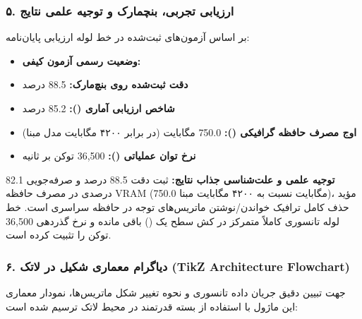 \subsubsection*{۵. ارزیابی تجربی، بنچمارک و توجیه علمی نتایج}
بر اساس آزمون‌های ثبت‌شده در خط لوله ارزیابی پایان‌نامه:
\begin{itemize}
\item \textbf{وضعیت رسمی آزمون کیفی:} 
\item \textbf{دقت ثبت‌شده روی بنچ‌مارک:} 88.5 درصد
\item \textbf{شاخص ارزیابی آماری ():} 85.2 درصد
\item \textbf{اوج مصرف حافظه گرافیکی ():} 750.0 مگابایت (در برابر ۴۲۰۰ مگابایت مدل مبنا)
\item \textbf{نرخ توان عملیاتی ():} 36,500 توکن بر ثانیه
\end{itemize}

\textbf{توجیه علمی و علت‌شناسی جذاب نتایج:}
ثبت دقت 88.5 درصد و صرفه‌جویی 82.1 درصدی در مصرف حافظه VRAM (750.0 مگابایت نسبت به ۴۲۰۰ مگابایت مبنا)، مؤید حذف کامل ترافیک خواندن/نوشتن ماتریس‌های توجه در حافظه سراسری است. خط لوله تانسوری کاملاً متمرکز در کش سطح یک () باقی مانده و نرخ گذردهی 36,500 توکن را تثبیت کرده است.



\subsubsection*{۶. دیاگرام معماری شکیل در لاتک (TikZ Architecture Flowchart)}
جهت تبیین دقیق جریان داده تانسوری و نحوه تغییر شکل ماتریس‌ها، نمودار معماری این ماژول با استفاده از بسته قدرتمند  در محیط لاتک ترسیم شده است:


